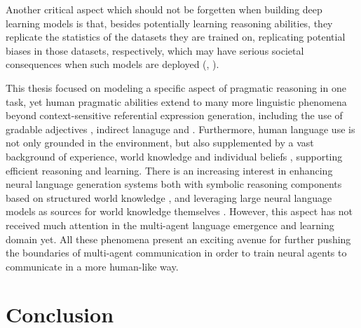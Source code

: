 Another critical aspect which should not be forgetten when building deep learning models is that, besides potentially learning reasoning abilities, they replicate the statistics of the datasets they are trained on, replicating potential biases in those datasets, respectively, which may have serious societal consequences when such models are deployed (\cite{bender2021dangers}, \cite{buolamwini2018gender}). 

This thesis focused on modeling a specific aspect of pragmatic reasoning in one task, yet human pragmatic abilities extend to many more linguistic phenomena beyond context-sensitive referential expression generation, including the use of gradable adjectives \parencite{qing2014gradable}, indirect lanaguge \parencite{yoon2016talking} and .
Furthermore, human language use is not only grounded in the environment, but also supplemented by a vast background of experience, world knowledge and individual beliefs \parencite{lake2017building, franke2016does}, supporting efficient reasoning and learning. There is an increasing interest in enhancing neural language generation systems both with symbolic reasoning components based on structured world knowledge \parencite[e.~g.,][]{nye2021improving}, and leveraging large neural language models as sources for world knowledge themselves \parencite{petroni2019language}. However, this aspect has not received much attention in the multi-agent language emergence and learning domain yet. 
All these phenomena present an exciting avenue for further pushing the boundaries of multi-agent communication in order to train neural agents to communicate in a more human-like way. 

\section{Conclusion}
